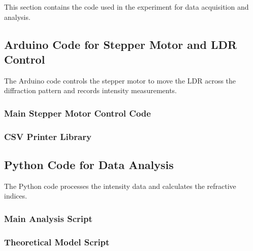 This section contains the code used in the experiment for data acquisition and analysis.

\subsection{Arduino Code for Stepper Motor and LDR Control}
\label{subsec:arduino_code}

The Arduino code controls the stepper motor to move the LDR across the diffraction pattern and records intensity measurements.

\subsubsection{Main Stepper Motor Control Code}
\label{subsubsec:main_stepper_motor_code}




\subsubsection{CSV Printer Library}
\label{subsubsec:csv_printer_library}



\subsection{Python Code for Data Analysis}
\label{subsec:python_code}

The Python code processes the intensity data and calculates the refractive indices.

\subsubsection{Main Analysis Script}
\label{subsubsec:main_analysis_script}



\subsubsection{Theoretical Model Script}
\label{subsubsec:theoretical_model_script}

